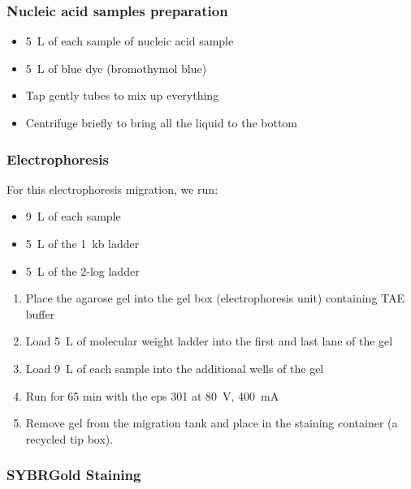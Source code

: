 \subsubsection{Nucleic acid samples preparation}

\begin{itemize}
\item 5~\textmu L of each sample of nucleic acid sample
\item 5~\textmu L of blue dye (bromothymol blue)
\item Tap gently tubes to mix up everything
\item Centrifuge briefly to bring all the liquid to the bottom
\end{itemize}

\subsubsection{Electrophoresis}

For this electrophoresis migration, we run:
\begin{itemize}
\item 9~\textmu L of each sample 
\item 5~\textmu L of the 1~kb ladder
\item 5~\textmu L of the 2-log ladder
\end{itemize}

\begin{enumerate}
\item Place the agarose gel into the gel box (electrophoresis unit) containing TAE buffer
\item Load 5~\textmu L of molecular weight ladder into the first and last lane of the gel
\item Load 9~\textmu L of each sample into the additional wells of the gel
\item Run for 65 min with the \gls{eps} 301 at 80~V, 400~mA
\item Remove gel from the migration tank and place in the staining container (a recycled tip box).
\end{enumerate}

\subsubsection{SYBR\cR Gold Staining}


